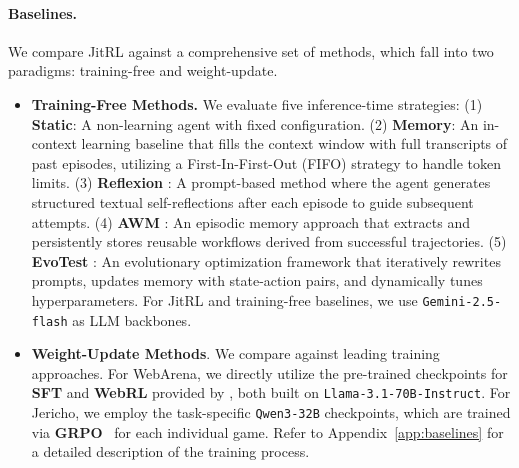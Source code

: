 \paragraph{Baselines.}
We compare JitRL against a comprehensive set of methods, which fall into two paradigms: training-free and weight-update. 

\begin{itemize}[leftmargin=*,nosep]
    \item \textbf{Training-Free Methods.} We evaluate five inference-time strategies:
    (1) \textbf{Static}: A non-learning agent with fixed configuration.
    (2) \textbf{Memory}: An in-context learning baseline that fills the context window with full transcripts of past episodes, utilizing a First-In-First-Out (FIFO) strategy to handle token limits.
    (3) \textbf{Reflexion} \citep{reflexion}: A prompt-based method where the agent generates structured textual self-reflections after each episode to guide subsequent attempts.
    (4) \textbf{AWM} \citep{awm}: An episodic memory approach that extracts and persistently stores reusable workflows derived from successful trajectories.
    (5) \textbf{EvoTest} \citep{evotest}: An evolutionary optimization framework that iteratively rewrites prompts, updates memory with state-action pairs, and dynamically tunes hyperparameters. For JitRL and training-free baselines, we use \texttt{Gemini-2.5-flash} as LLM backbones.

    \item \textbf{Weight-Update Methods}. We compare against leading training approaches. For WebArena, we directly utilize the pre-trained checkpoints for \textbf{SFT} and \textbf{WebRL} provided by \cite{webrl}, both built on \texttt{Llama-3.1-70B-Instruct}. For Jericho, we employ the task-specific \texttt{Qwen3-32B} checkpoints, which are trained via \textbf{GRPO}~\citep{grpo} for each individual game. Refer to Appendix~\ref{app:baselines} for a detailed description of the training process.
\end{itemize}


